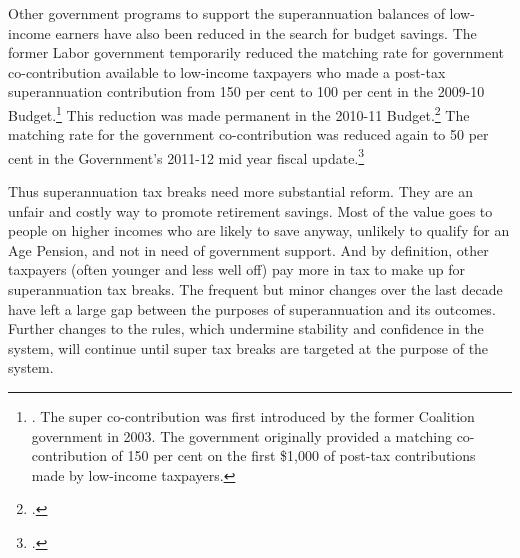 Other government programs to support the superannuation balances of low-income earners have also been reduced in the search for budget savings. The former Labor government temporarily reduced the matching rate for government co-contribution available to low-income taxpayers who made a post-tax superannuation contribution from 150 per cent to 100 per cent in the 2009-10 Budget.\footnote{\textcite{Treasury2009BudgetPapers0910}. The super co-contribution was first introduced by the former Coalition government in 2003. The government originally provided a matching co-contribution\DEVIATION{} of 150 per cent on the first \$1,000 of post-tax contributions made by low-income taxpayers.}   
This reduction was made permanent in the 2010-11 Budget.\footcite[][298]{Treasury2010Budget1011no2}  
The matching rate for the government co-contribution was reduced again to 50 per cent in the Government’s 2011-12 mid year fiscal update.\footcite[][291]{Treasury2011MYEFO1112} 

Thus superannuation tax breaks need more substantial reform. They are an unfair and costly way to promote retirement savings. Most of the value goes to people on higher incomes who are likely to save anyway, unlikely to qualify for an Age Pension, and not in need of government support. And by definition, other taxpayers (often younger and less well off) pay more in tax to make up for superannuation tax breaks. The frequent but minor changes over the last decade have left a large gap between the purposes of superannuation and its outcomes. Further changes to the rules, which undermine stability and confidence in the system, will continue until super tax breaks are targeted at the purpose of the system.

